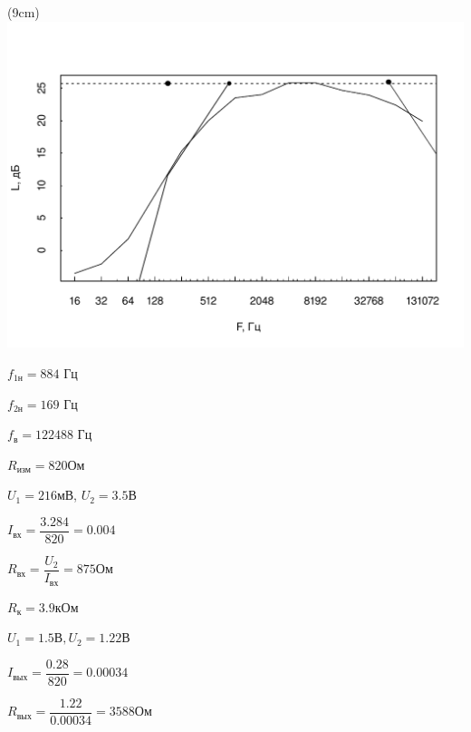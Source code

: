 \sidefig(9cm){\includegraphics[scale=0.55]{d_2.pdf}}
{}

\begin{multicols}{2}
$f_{1н} = 884$ Гц

$f_{2н} = 169$ Гц

$f_{в} = 122 488$ Гц

$R_{изм} = 820 Ом$

$U_1 = 216 мВ$, $U_2 = 3.5 В$

\vspace{1mm}
$I_{вх} = \dfrac{3.284}{820} = 0.004$

\vspace{1mm}
$R_{вх} = \dfrac{U_2}{I_{вх}} = 875 Ом$

$R_к = 3.9 кОм$

$U_1 = 1.5 В, U_2 = 1.22 В$

\vspace{1mm}
$I_{вых} = \dfrac{0.28}{820} = 0.00034$

\vspace{1mm}
$R_{вых} = \dfrac{1.22}{0.00034} = 3588 Ом$


\end{multicols}
